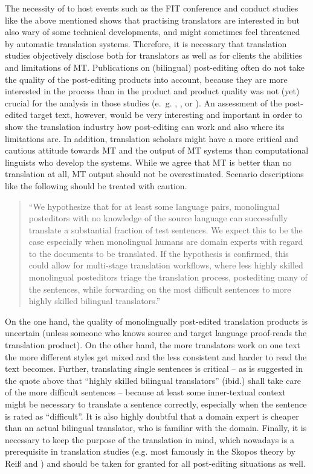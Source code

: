 \documentclass[output=paper]{langsci/langscibook}
\begin{document}
The necessity of to host events such as the FIT conference and conduct studies like the above mentioned shows that practising translators are interested in but also wary of some technical developments, and might sometimes feel threatened by automatic translation systems. Therefore, it is necessary that translation studies objectively disclose both for translators as well as for clients the abilities and limitations of MT. Publications on (bilingual) post-editing often do not take the quality of the post-editing products into account, because they are more interested in the process than in the product and product quality was not (yet) crucial for the analysis in those studies (e.~g. \citet{almeida2010}, \citet{Winther2014}, or \citet{bangalore2015}). An assessment of the post-edited target text, however, would be very interesting and important in order to show the translation industry how post-editing can work and also where its limitations are. In addition, translation scholars might have a more critical and cautious attitude towards MT and the output of MT systems than computational linguists who develop the systems. While we agree that MT is better than no translation at all, MT output should not be overestimated. Scenario descriptions like the following should be treated with caution.


\begin{quotation}
“We hypothesize that for at least some language pairs, monolingual posteditors with no knowledge of the source language can successfully translate a substantial fraction of test sentences. We expect this to be the case especially when monolingual humans are domain experts with regard to the documents to be translated. If the hypothesis is confirmed, this could allow for multi-stage translation workflows, where less highly skilled monolingual posteditors triage the translation process, postediting many of the sentences, while forwarding on the most difficult sentences to more highly skilled bilingual translators.” \citep[pg. 191]{schwartz2014}\end{quotation}

On the one hand, the quality of monolingually post-edited translation products is uncertain (unless someone who knows source and target language proof-reads the translation product). On the other hand, the more translators work on one text the more different styles get mixed and the less consistent and harder to read the text becomes. Further, translating single sentences is critical – as is suggested in the quote above that “highly skilled bilingual translators” (ibid.) shall take care of the more difficult sentences – because at least some inner-textual context might be necessary to translate a sentence correctly, especially when the sentence is rated as “difficult”. It is also highly doubtful that a domain expert is cheaper than an actual bilingual translator, who is familiar with the domain. Finally, it is necessary to keep the purpose of the translation in mind, which nowadays is a prerequisite in translation studies (e.g. most famously in the Skopos theory by Reiß and \citet{Vermeer1984}) and should be taken for granted for all post-editing situations as well.
\end{document}

